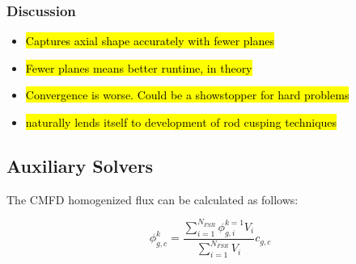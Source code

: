\begin{table}
\caption{Comparison of subplane scheme to traditional 2D/1D for VERA Progression Problem 5}
\begin{center}
\end{center}
\end{table}

\subsubsection{Discussion}

\begin{itemize}
\item \hl{Captures axial shape accurately with fewer planes}
\item \hl{Fewer planes means better runtime, in theory}
\item \hl{Convergence is worse.  Could be a showstopper for hard problems}
\item \hl{naturally lends itself to development of rod cusping techniques}
\end{itemize}

\subsection{Auxiliary Solvers}

The CMFD homogenized flux can be calculated as follows:

\begin{equation}\label{e:CMFDsubplaneFlux}
\phi^k_{g,c} = \frac{\sum_{i=1}^{N_{FSR}} \phi^{k=1}_{g,i} V_i}{\sum_{i=1}^{N_{FSR}} V_i} c_{g,c}
\end{equation}


